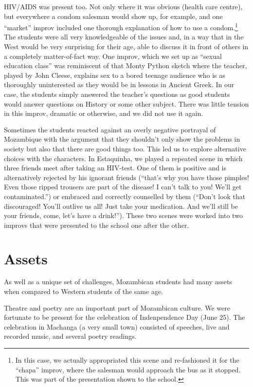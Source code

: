 \documentclass[article,twocolumn,twoside]{memoir}
\begin{document}
HIV/AIDS was present too. Not only where it was obvious (health care centre),
but everywhere a condom salesman would show up, for example, and one ``market''
improv included one thorough explanation of how to use a condom.\footnote{In
this case, we actually appropriated this scene and re-fashioned it for the
``chapa'' improv, where the salesman would approach the bus as it stopped. This
was part of the presentation shown to the school.} The students were all
very knowledgeable of the issues and, in a way that in the West would be very
surprising for their age, able to discuss it in front of others in a completely
matter-of-fact way. One improv, which we set up as ``sexual education class''
was reminiscent of that Monty Python sketch where the teacher, played by John
Cleese, explains sex to a bored teenage audience who is as thoroughly
uninterested as they would be in lessons in Ancient Greek. In our case, the
students simply answered the teacher's questions as good students would answer
questions on History or some other subject. There was little tension in this
improv, dramatic or otherwise, and we did not use it again.

Sometimes the students reacted against an overly negative portrayal of
Mozambique with the argument that they shouldn't only show the problems in
society but also that there are good things too. This led us to explore
alternative choices with the characters. In Estaquinha, we played a repeated
scene in which three friends meet after taking an HIV-test. One of them is
positive and is alternatively rejected by his ignorant friends (``that's why
you have those pimples! Even those ripped trousers are part of the disease! I
can't talk to you! We'll get contaminated.'') or embraced and correctly
counselled by them (``Don't look that discouraged! You'll outlive us all! Just
take your medication. And we'll still be your friends, come, let's have a
drink!''). These two scenes were worked into two improvs that were presented to
the school one after the other.

\chapter{Assets}
As well as a unique set of challenges, Mozambican students had many assets when
compared to Western students of the same age.

Theatre and poetry are an important part of Mozambican culture. We were
fortunate to be present for the celebration of Indenpendence Day (June 25). The
celebration in Machanga (a very small town) consisted of speeches, live and
recorded music, and several poetry readings.
\end{document}
